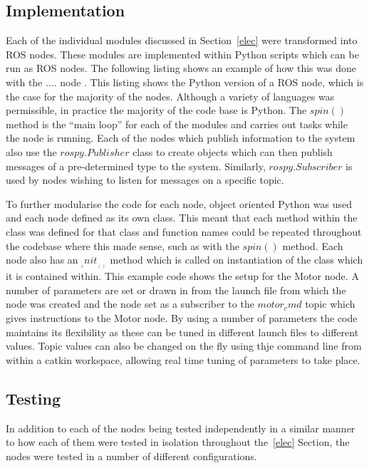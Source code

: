 \subsection{Implementation}\label{soft/ROS/impl}
Each of the individual modules discussed in Section~\ref{elec} were transformed 
into ROS nodes. These modules are implemented within Python scripts which can be 
run as ROS nodes. The following listing shows an example of how this was done 
with the .... node . This listing shows the Python 
version of a ROS node, which is the case for the majority of the nodes. Although 
a variety of languages was permissible, in practice the majority of the code base 
is Python. The $spin()$ method is the ``main loop'' for each of the modules and 
carries out tasks while the node is running. Each of the nodes which publish 
information to the system also use the $rospy.Publisher$ class to create objects 
which can then publish messages of a pre-determined type to the system. 
Similarly, $rospy.Subscriber$ is used by nodes wishing to listen for messages on 
a specific topic. 

To further modularise the code for each node, object oriented Python was used and 
each node defined as its own class. This meant that each method within the class 
was defined for that class and function names could be repeated throughout the 
codebase where this made sense, such as with the $spin()$ method. Each node also 
has an $__init__()$ method which is called on instantiation of the class which it 
is contained within. This  example code shows the setup 
for the Motor node. A number of parameters are set or drawn in from the launch 
file from which the node was created and the node set as a subscriber to the 
$motor_cmd$ topic which gives instructions to the Motor node. By using a number of parameters the code maintains its flexibility as these can be tuned in different launch files to different values. Topic values can also be changed on the fly using thje command line from within a catkin workspace, allowing real time tuning of parameters to take place. 


\subsection{Testing}\label{soft/ROS/test}
In addition to each of the nodes being tested independently in a similar manner to how each of them were tested in isolation throughout the~\ref{elec} Section, the nodes were tested in a number of different configurations.  

